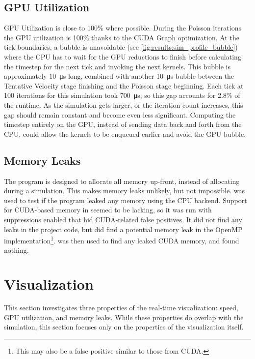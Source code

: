 \subsection{GPU Utilization}\label{sec:Results:Sim:Efficiency}

GPU Utilization is close to 100\% where possible.
During the Poisson iterations the GPU utilization is 100\% thanks to the CUDA Graph optimization.
At the tick boundaries, a bubble is unavoidable (see \cref{fig:results:sim_profile_bubble}) where the CPU has to wait for the GPU reductions to finish before calculating the timestep for the next tick and invoking the next kernels.
This bubble is approximately \SI{10}{\micro\second} long, combined with another \SI{10}{\micro\second} bubble between the Tentative Velocity stage finishing and the Poisson stage beginning.
Each tick at 100 iterations for this simulation took \SI{700}{\micro\second}, so this gap accounts for 2.8\% of the runtime.
As the simulation gets larger, or the iteration count increases, this gap should remain constant and become even less significant.
Computing the timestep entirely on the GPU, instead of sending data back and forth from the CPU, could allow the kernels to be enqueued earlier and avoid the GPU bubble.

\subsection{Memory Leaks}\label{sec:Results:Sim:Mem}
The program is designed to allocate all memory up-front, instead of allocating during a simulation.
This makes memory leaks unlikely, but not impossible.
 was used to test if the program leaked any memory using the CPU backend.
Support for CUDA-based memory in  seemed to be lacking, so it was run with suppressions enabled that hid CUDA-related false positives.
It did not find any leaks in the project code, but did find a potential memory leak in the OpenMP implementation\footnote{This may also be a false positive similar to those from CUDA.}.
 was then used to find any leaked CUDA memory, and found nothing.%

\pagebreak
\section{Visualization}\label{sec:Results:Viz}
This section investigates three properties of the real-time visualization: speed, GPU utilization, and memory leaks.
While these properties do overlap with the simulation, this section focuses only on the properties of the visualization itself.

